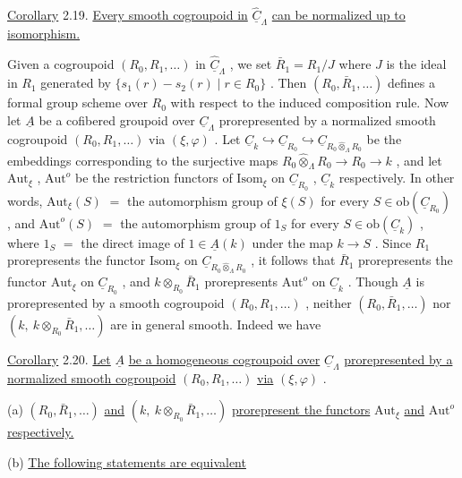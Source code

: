 \underline{Corollary} 2.19.  \underline{Every smooth cogroupoid in}  $\hat{\underline{C}}_\Lambda$  \underline{can be normalized up to isomorphism.}

Given a cogroupoid  $(R_0,R_1,\dots)$  in  $\hat{\underline{C}}_\Lambda$ , we set  $\bar{R}_1 = R_1/J$  where  $J$  is the ideal in  $R_1$  generated by  $\{s_1(r) - s_2(r) \mid r \in R_0\}$ . Then  $(R_0,\bar{R}_1,\dots)$  defines a formal group scheme over  $R_0$  with respect to the induced composition rule. Now let  $\underline{A}$  be a cofibered groupoid over  $\underline{C}_\Lambda$  prorepresented by a normalized smooth cogroupoid  $(R_0,R_1,\dots)$  via  $(\xi,\varphi)$ . Let  $\underline{C}_k \hookrightarrow \underline{C}_{R_0} \hookrightarrow \underline{C}_{R_0 \hat{\otimes}_\Lambda R_0}$  be the embeddings corresponding to the surjective maps  $R_0 \hat{\otimes}_\Lambda R_0 \longrightarrow R_0 \longrightarrow k$ , and let  $\mathrm{Aut}_\xi$ , $\mathrm{Aut}^o$  be the restriction functors of  $\mathrm{Isom}_\xi$  on  $\underline{C}_{R_0}$ , $\underline{C}_k$  respectively. In other words,  $\mathrm{Aut}_\xi(S)$ $=$ the automorphism group of  $\xi(S)$  for every  $S \in \mathrm{ob}(\underline{C}_{R_0})$ , and  $\mathrm{Aut}^o(S)$ $=$ the automorphism group of  $1_S$  for every  $S \in \mathrm{ob}(\underline{C}_k)$ , where  $1_S$ $=$ the direct image of  $1 \in \underline{A}(k)$  under the map  $k \to S$ . Since  $R_1$  prorepresents the functor  $\mathrm{Isom}_\xi$  on  $\underline{C}_{R_0 \hat{\otimes}_\Lambda R_0}$ , it follows that  $\bar{R}_1$  prorepresents the functor  $\mathrm{Aut}_\xi$  on  $\underline{C}_{R_0}$ , and  $k \otimes_{R_0} \bar{R}_1$  prorepresents  $\mathrm{Aut}^o$  on  $\underline{C}_k$ . Though  $\underline{A}$  is prorepresented by a smooth cogroupoid  $(R_0,R_1,\dots)$  , neither  $(R_0,\bar{R}_1,\dots)$  nor  $(k,\ k \otimes_{R_0} \bar{R}_1,\dots)$  are in general smooth. Indeed we have

\underline{Corollary} 2.20.  \underline{Let}  $\underline{A}$  \underline{be a homogeneous cogroupoid over}  $\underline{C}_\Lambda$  \underline{prorepresented by a normalized smooth cogroupoid}  $(R_0,R_1,\dots)$  \underline{via}  $(\xi,\varphi)$  .

(a)  $(R_0,\bar{R}_1,\dots)$  \underline{and}  $(k,\ k \otimes_{R_0} \bar{R}_1,\dots)$  \underline{prorepresent the functors}  $\mathrm{Aut}_\xi$  \underline{and}  $\mathrm{Aut}^o$  \underline{respectively.}

(b)  \underline{The following statements are equivalent}

